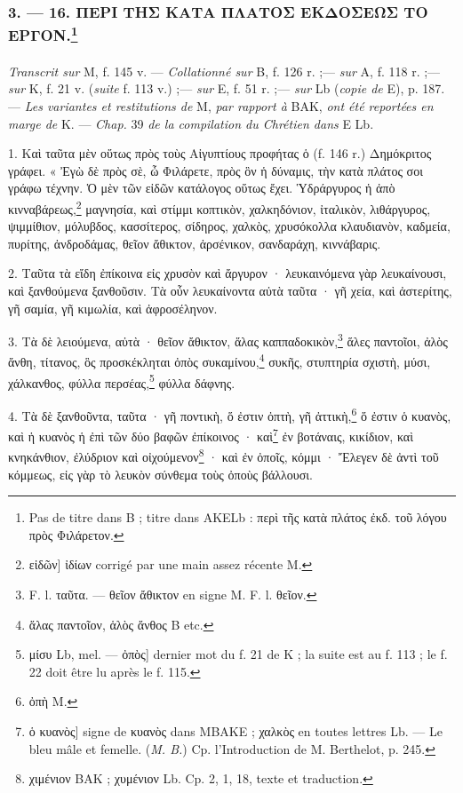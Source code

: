\documentclass[landscape, a4paper, 11pt, oneside, polutonikogreek, french]{article}
\begin{document}
\subsubsection[3. --- 16. ΠΕΡΙ ΤΗΣ ΚΑΤΑ ΠΛΑΤΟΣ ΕΚΔΟΣΕΩΣ ΤΟ ΕΡΓΟΝ.]{3. --- 16. ΠΕΡΙ ΤΗΣ ΚΑΤΑ ΠΛΑΤΟΣ ΕΚΔΟΣΕΩΣ ΤΟ ΕΡΓΟΝ.\footnote{Pas de titre dans B ; titre dans AKELb : περὶ τῆς κατὰ πλάτος ἐκδ. τοῦ λόγου πρὸς Φιλάρετον.}}
\paragraph{}
\emph{Transcrit sur} M, f. 145 v. --- \emph{Collationné sur} B, f. 126 r. ;--- \emph{sur} A, f. 118 r. ;--- \emph{sur} K, f. 21 v. (\emph{suite} f. 113 v.) ;--- \emph{sur} E, f. 51 r. ;--- \emph{sur} Lb (\emph{copie de} E), p. 187. --- \emph{Les variantes et restitutions de} M, \emph{par rapport à} BAK, \emph{ont été reportées en marge de} K. --- \emph{Chap.} 39 \emph{de la compilation du Chrétien dans} E Lb.

\bigskip

1. Καὶ ταῦτα μὲν οὕτως πρὸς τοὺς Αἰγυπτίους προφήτας ὁ (f. 146 r.) Δημόκριτος γράφει. « Ἐγὼ δὲ πρὸς σὲ, ὦ Φιλάρετε, πρὸς ὃν ἡ δύναμις, τὴν κατὰ πλάτος σοι γράφω τέχνην. Ὁ μὲν τῶν εἰδῶν κατάλογος οὕτως ἔχει. Ὑδράργυρος ἡ ἀπὸ κινναβάρεως,\footnote{εἰδῶν] ἰδίων corrigé par une main assez récente M.} μαγνησία, καὶ στίμμι κοπτικὸν, χαλκηδόνιον, ἰταλικὸν, λιθάργυρος, ψιμμίθιον, μόλυβδος, κασσίτερος, σίδηρος, χαλκὸς, χρυσόκολλα κλαυδιανὸν, καδμεία, πυρίτης, ἀνδροδάμας, θεῖον ἄθικτον, ἀρσένικον, σανδαράχη, κιννάβαρις.

2. Ταῦτα τὰ εἴδη ἐπίκοινα εἰς χρυσὸν καὶ ἄργυρον · λευκαινόμενα γὰρ λευκαίνουσι, καὶ ξανθούμενα ξανθοῦσιν. Τὰ οὖν λευκαίνοντα αὐτὰ ταῦτα · γῆ χεία, καὶ ἀστερίτης, γῆ σαμία, γῆ κιμωλία, καὶ ἀφροσέληνον.

3. Τὰ δὲ λειούμενα, αὐτὰ · θεῖον ἄθικτον, ἅλας καππαδοκικὸν,\footnote{F. l. ταῦτα. --- θεῖον ἄθικτον en signe M. F. l. θεῖον.} ἅλες παντοῖοι, ἀλὸς ἄνθη, τίτανος, ὃς προσκέκληται ὀπὸς συκαμίνου,\footnote{ἅλας παντοῖον, ἁλὸς ἄνθος B etc.} συκῆς, στυπτηρία σχιστὴ, μύσι, χάλκανθος, φύλλα περσέας,\footnote{μίσυ Lb, mel. --- ὀπὸς] dernier mot du f. 21 de K ; la suite est au f. 113 ; le f. 22 doit être lu après le f. 115.} φύλλα δάφνης.

4. Τὰ δὲ ξανθοῦντα, ταῦτα · γῆ ποντικὴ, ὅ ἐστιν ὀπτὴ, γῆ ἀττικὴ,\footnote{ὀπὴ M.} ὅ ἐστιν ὁ κυανὸς, καὶ ἡ κυανὸς ἡ ἐπὶ τῶν δύο βαφῶν ἐπίκοινος · καὶ\footnote{ὁ κυανὸς] signe de κυανὸς dans MBAKE ; χαλκὸς en toutes lettres Lb. --- Le bleu mâle et femelle. (\emph{M. B.}) Cp. l'Introduction de M. Berthelot, p. 245.} ἐν βοτάναις, κικίδιον, καὶ κνηκάνθιον, ἐλύδριον καὶ οἰχούμενον\footnote{χιμένιον BAΚ ; χυμένιον Lb. Cp. 2, 1, 18, texte et traduction.} · καὶ ἐν ὀποῖς, κόμμι · Ἔλεγεν δὲ ἀντὶ τοῦ κόμμεως, εἰς γὰρ τὸ λευκὸν σύνθεμα τοὺς ὀποὺς βάλλουσι.
\end{document}
